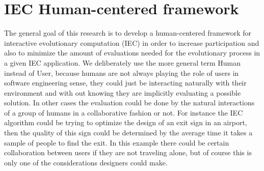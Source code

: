 \documentclass[conference]{IEEEtran}
\begin{document}
\section{IEC Human-centered framework}
\label{sec:HCF}
The general goal of this research is to develop a human-centered \cite{gasson2003human} framework
for interactive evolutionary computation (IEC) in order to increase
participation and also to minimize the amount of evaluations needed for the
evolutionary process in a given IEC application. We deliberately use the 
more general
term Human instead of User, because humans are not always playing the role of
users in software engineering sense, they could just be interacting 
naturally with their environment and with out knowing they are implicitly
evaluating a possible solution. In other cases the evaluation could be done
by the natural interactions of a group of humans in a collaborative fashion
or not. For instance the IEC algorithm could be trying to optimize 
the design of an exit sign in an airport, then the quality of this sign could be
determined by the average time it takes a sample of people to 
find the exit. In this example there could be certain collaboration
between users if they are not traveling alone, but of course this is only one of
the considerations designers could make. 
\end{document}
